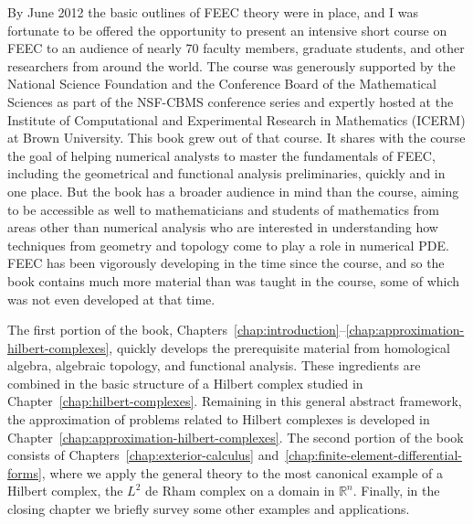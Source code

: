 {By June 2012 the basic outlines of FEEC theory were in place, and I was fortunate to be offered the opportunity to present an intensive short course on FEEC to an audience of nearly 70 faculty members, graduate students, and other researchers from around the world. The course was generously supported by the National Science Foundation and the Conference Board of the Mathematical Sciences as part of the NSF-CBMS conference series and expertly hosted at the Institute of Computational and Experimental Research in Mathematics (ICERM) at Brown University. This book grew out of that course. It shares with the course the goal of helping numerical analysts to master the fundamentals of FEEC, including the geometrical and functional analysis preliminaries, quickly and in one place. But the book has a broader audience in mind than the course, aiming to be accessible as well to mathematicians and students of mathematics from areas other than numerical analysis who are interested in understanding how techniques from geometry and topology come to play a role in numerical PDE. FEEC has been vigorously developing in the time since the course, and so the book contains much more material than was taught in the course, some of which was not even developed at that time.}

{The first portion of the book, Chapters~\ref{chap:introduction}--\ref{chap:approximation-hilbert-complexes}, quickly develops the prerequisite material from homological algebra, algebraic topology, and functional analysis. These ingredients are combined in the basic structure of a Hilbert complex studied in Chapter~\ref{chap:hilbert-complexes}. Remaining in this general abstract framework, the approximation of problems related to Hilbert complexes is developed in Chapter~\ref{chap:approximation-hilbert-complexes}. The second portion of the book consists of Chapters~\ref{chap:exterior-calculus} and~\ref{chap:finite-element-differential-forms}, where we apply the general theory to the most canonical example of a Hilbert complex, the $L^2$ de Rham complex on a domain in $\mathbb R^n$. Finally, in the closing chapter we briefly survey some other examples and applications.}

